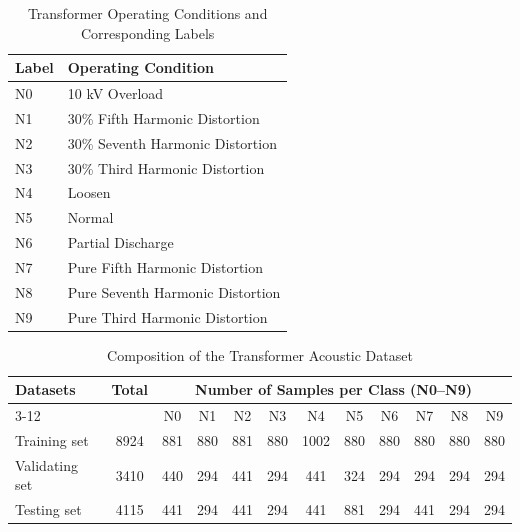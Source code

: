\documentclass[journal]{IEEEtran}
\begin{document}
\begin{table}
	\caption{Transformer Operating Conditions and Corresponding Labels}
	\centering
	\begin{tabular}{ll}
		\toprule
		Label & Operating Condition \\
		\midrule
		N0 & 10 kV Overload \\
		N1 & 30\% Fifth Harmonic Distortion \\
		N2 & 30\% Seventh Harmonic Distortion \\
		N3 & 30\% Third Harmonic Distortion \\
		N4 & Loosen \\
		N5 & Normal \\
		N6 & Partial Discharge \\
		N7 & Pure Fifth Harmonic Distortion \\
		N8 & Pure Seventh Harmonic Distortion \\
		N9 & Pure Third Harmonic Distortion \\
		\bottomrule
	\end{tabular}
	\label{tab:operating_conditions}
\end{table}

\begin{table}
	\centering
	\caption{Composition of the Transformer Acoustic Dataset}
	\label{dataset}
	\begin{tabular}{l c c c c c c c c c c c}
		\toprule
		\multirow{2}{*}{Datasets} & 
		\multirow{2}{*}{Total} & 
		\multicolumn{10}{c}{Number of Samples per Class (N0–N9)} \\
		\cmidrule(lr){3-12}
		&  & N0 & N1 & N2 & N3 & N4 & N5 & N6 & N7 & N8 & N9 \\
		\midrule
		Training set & 8924 & 881 & 880 & 881 & 880 & 1002 & 880 & 880 & 880 & 880 & 880\\
		Validating set & 3410 & 440 & 294 & 441 & 294 & 441 & 324 & 294 & 294 & 294 & 294\\
		Testing set & 4115 & 441 & 294 & 441 & 294 & 441 & 881 & 294 & 441 & 294 & 294 \\
		\bottomrule
	\end{tabular}
\end{table}
\end{document}
